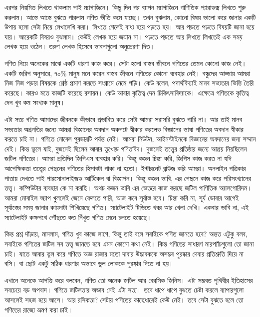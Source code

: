 \documentclass[
]{book}
\begin{document}
এরপর নিয়মিত লিখতে থাকলাম পাই ম্যাগাজিনে। কিছু দিন পর ব্যাপন ম্যাগাজিনে গাণিতিক প্যারাডক্স লিখতে শুরু করলাম। আস্তে আস্তে বুঝতে পারলাম গণিত ভীতি কমে যাচ্ছে। তখন বুঝলাম, কোনো বিষয় ভালো করে জানার একটি উপায় হলো সেটা নিয়ে লেখালেখি করা। লিখতে গেলেই বাধ্য হয়ে পড়তে হয়। আর পড়তে পড়তে বিষয়টি জানা হয়ে যায়। আরেকটি বিষয়ও বুঝলাম। কেউই লেখক হয়ে জন্মান না। পড়তে পড়তে আর লিখতে লিখতেই এক সময় লেখক হয়ে ওঠেন। তরুণ লেখক হিসেবে ভাবনাগুলো অনুপ্রেরণা দিত।

গণিত নিয়ে অনেকের মাঝে একটি ধারণা কাজ করে। সেটা হলো বাস্তব জীবনে গণিতের তেমন কোনো কাজ নেই। একটি জরিপ অনুসারে, ৭০\% মানুষ মনে করেন বাস্তব জীবনে গণিতের কোনো ব্যবহার নেই। বন্ধুদের আড্ডায় আমরা নিজ নিজ পড়ার বিষয়কে শ্রেষ্ঠ প্রমাণ করতে সংগ্রামে নেমে পড়ি। কেউ বলেন, পদার্থবিদ্যাই মানব সভ্যতার ভিত্তি তৈরি করেছে। কারও মতে কাজটি করেছে রসায়ন। কেউ আবার কৃতিত্ব দেন চিকিৎসাবিদ্যাকে। এক্ষেত্রে গণিতকে কৃতিত্ব দেন খুব কম সংখ্যক মানুষ।

এটা সত্য গণিত আমাদের জীবনকে কীভাবে প্রভাবিত করে সেটা আমরা সরাসরি বুঝতে পারি না। আর তাই মানব সভ্যতার অগ্রগতির জন্যে আমরা বিজ্ঞানের অবদান অকপটে স্বীকার করলেও বিজ্ঞানের ভাষা গণিতের অবদান স্বীকার করতে চাই না। গণিতে নোবেল পুরষ্কারটি পর্যন্ত নেই। আমরা নিউটন, আইনস্টাইনকে বিজ্ঞানের অবদানের জন্য সম্মান দেই। কিন্ত ভুলে যাই, দুজনেই ছিলেন আবার তুখোড় গণিতবিদ। দুজনেই তত্ত্বের প্রতিষ্ঠার জন্যে আশ্রয় নিয়ছিলেন জটিল গণিতের।
আমরা প্রতিদিন জিপিএস ব্যবহার করি। কিন্তু কজন চিন্তা করি, জিপিস কাজ করত না যদি আপেক্ষিকতা তত্ত্বের পেছনের গণিতের হিসাবটা পাকা না হতো। ইন্টারনেট ব্রাউজ করি আমরা। অনলাইন পত্রিকার পাতায় দেখতে পাই পারসোনালাইজড আর্টিকেল বা বিজ্ঞাপন। কিন্তু কজন ভাবি, এর পেছনে কাজ করে পরিসংখ্যানের তত্ত্ব। কম্পিউটার ব্যবহার কে না করছি। অথচ কজন ভাবি এর ভেতরে কাজ করছে জটিল গাণিতিক অ্যালগোরিদম। আমরা মোবাইল অ্যাপ খুললেই জেনে ফেলতে পারি, আজ কবে সূর্যাস্ত হবে। চিন্তা করি না, সূর্য ডোবার আগেই সূর্যাস্তের সময় জানার কায়দাটা শিখিয়েছে গণিত। স্যাটেলাইট টিভিতে খবর আর খেলা দেখি। একবার ভাবি না, এই স্যাটেলাইট কক্ষপথে পৌঁছতে কত নিঁখুত গণিত মেনে চলতে হয়েছে।

কিন্ত প্রশ্ন দাঁড়ায়, মানলাম, গণিত খুব কাজে লাগে, কিন্তু তাই বলে সবাইকে গণিত জানতে হবে? অন্তত এটুকু বলব, সবাইকে গণিতের জটিল সব তত্ত্ব জানতে হবে এমন কোনো কথা নেই। কিন্ত গণিতের সাধারণ মারপ্যাঁচগুলো তো জানা চাই। যাতে আবার ভুল করে গণিতে অজ্ঞ রাজার মতো দাবার উদ্ভাবককে অসম্ভব পুরষ্কার দেবার প্রতিশ্রুতি দিয়ে না বসি। বা ছোট একটু সঠিক ধারণার অভাবে ভুল লোককে পুরষ্কার দিতে না হয়।

এখানে অনেকে আপত্তি করে বলবেন, গণিত তো অনেক জটিল আর বেরসিক জিনিস। এটা সম্ভবত পৃথিবীর ইতিহাসের সবচেয়ে বড় অপবাদ। গণিতে জটিলতার অভাব নেই এটা সত্য। তবে ধাপে ধাপে বুঝতে চেষ্টা করলে ব্যাপারগুলো আসলেই সহজ হয়ে আসে। আর রসিকতা? সেটায় গণিতের কাছেধারেই কেউ নেই। তবে সেটা বুঝতে হলে তো গণিতের রাজ্যে ভ্রমণ করা চাই।
\end{document}

